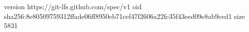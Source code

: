 version https://git-lfs.github.com/spec/v1
oid sha256:8e80509759312ffade06ff8950eb71cef47f2606a22fc35f43eed09e8ab9ced1
size 5831
